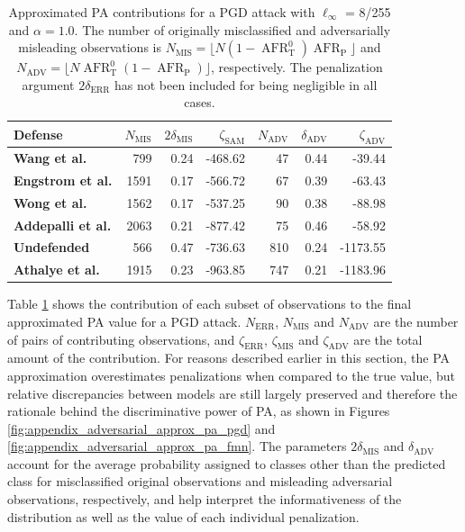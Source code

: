 \begin{table}[H]
    \centering
    \begin{tabular}{l|rrr|rrr}
    Defense & $N_{\text{MIS}}$ & $2 \delta_{\text{MIS}}$ & $\zeta_{\text{SAM}}$ & $N_{\text{ADV}}$ & $\delta_{\text{ADV}}$ & $\zeta_{\text{ADV}}$ \\
    \midrule
    {\color{tab:brown} \textbf{Wang et al.}} & 799 & 0.24 & -468.62 & 47 & 0.44 & -39.44 \\
    {\color{tab:blue} \textbf{Engstrom et al.}} & 1591 & 0.17 & -566.72 & 67 & 0.39 & -63.43 \\
    {\color{tab:red} \textbf{Wong et al.}} & 1562 & 0.17 & -537.25 & 90 & 0.38 & -88.98 \\
    {\color{tab:purple} \textbf{Addepalli et al.}} & 2063 & 0.21 & -877.42 & 75 & 0.46 & -58.92 \\
    {\color{tab:orange} \textbf{Undefended}} & 566 & 0.47 & -736.63 & 810 & 0.24 & -1173.55 \\
    {\color{tab:green} \textbf{Athalye et al.}} & 1915 & 0.23 & -963.85 & 747 & 0.21 & -1183.96 \\
    \bottomrule
    \end{tabular}
    \caption{
    Approximated PA contributions for a PGD attack with $\ell_\infty$ = 8/255 and
    $\alpha = 1.0$. The number of originally misclassified and adversarially misleading
    observations is $N_{\text{MIS}} = \lfloor N (1-\operatorname{AFR}_\text{T}^0) \operatorname{AFR}_\text{P} \rfloor$ and
    $N_{\text{ADV}} = \lfloor N \operatorname{AFR}_\text{T}^0 (1-\operatorname{AFR}_\text{P}) \rfloor$, respectively. 
    The penalization argument $2 \delta_{\text{ERR}}$ has not
    been included for being negligible in all cases.
    }
    \label{tab:approx_pa_pgd_table}
\end{table}

Table \ref{tab:approx_pa_pgd_table} shows the contribution of each subset of observations to the final
approximated PA value for a PGD attack. $N_{\text{ERR}}$, $N_{\text{MIS}}$ and $N_{\text{ADV}}$ are 
the number of pairs of contributing observations, and $\zeta_{\text{ERR}}$, $\zeta_{\text{MIS}}$ and $\zeta_{\text{ADV}}$ are
the total amount of the contribution. For reasons described earlier in this section,
the PA approximation overestimates penalizations when compared to the true value, but
relative discrepancies between models are still largely preserved and therefore the rationale
behind the discriminative power of PA, as shown in Figures \ref{fig:appendix_adversarial_approx_pa_pgd}
and \ref{fig:appendix_adversarial_approx_pa_fmn}. The parameters $2 \delta_{\text{MIS}}$ and
$\delta_{\text{ADV}}$ account for the average probability assigned to classes other than the predicted
class for misclassified original observations and misleading adversarial observations, respectively, and 
help interpret the informativeness of the distribution as well as the value of each individual 
penalization. \\

